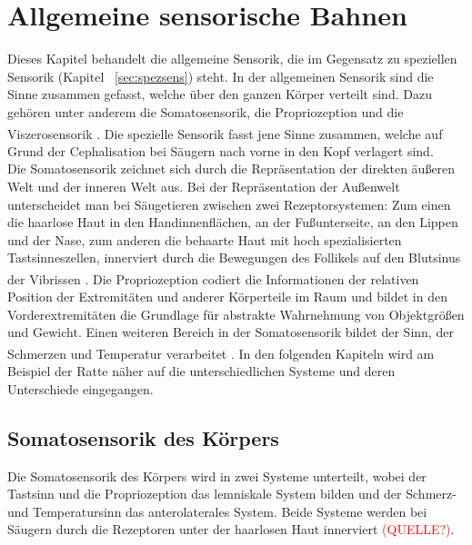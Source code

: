 \documentclass[12pt,a4paper,pdftex]{article}
\begin{document}


\newpage
\section{Allgemeine sensorische Bahnen} \label{sec:sensorische_Bahnen}
Dieses Kapitel behandelt die allgemeine Sensorik,  die im Gegensatz zu speziellen Sensorik (Kapitel~ \ref{sec:spezsens}) steht. In der allgemeinen Sensorik sind die Sinne zusammen gefasst, welche über den ganzen Körper verteilt sind. Dazu gehören unter anderem die Somatosensorik, die Propriozeption und die Viszerosensorik \textsuperscript{\cite[22]{kandel2013principles}}. Die spezielle Sensorik  fasst jene Sinne zusammen, welche auf Grund der Cephalisation bei Säugern nach vorne in den Kopf verlagert sind.
\\
\noindent
Die Somatosensorik zeichnet sich durch die Repräsentation der direkten äußeren Welt und der inneren Welt aus. Bei der Repräsentation der Außenwelt unterscheidet man bei Säugetieren zwischen zwei Rezeptorsystemen: Zum einen die haarlose Haut in den Handinnenflächen, an der Fußunterseite, an den Lippen und der Nase, zum anderen die behaarte Haut mit hoch spezialisierten Tastsinneszellen, innerviert durch die Bewegungen des Follikels auf den Blutsinus  der Vibrissen  \textsuperscript{\cite[24]{paxinos2014rat}}.
Die Propriozeption codiert die Informationen der relativen Position der Extremitäten und anderer Körperteile im Raum und bildet in den Vorderextremitäten die Grundlage für abstrakte Wahrnehmung von Objektgrößen und Gewicht. Einen weiteren Bereich in der Somatosensorik bildet der Sinn, der Schmerzen und Temperatur verarbeitet \textsuperscript{\cite[24]{paxinos2014rat}}.
In den folgenden Kapiteln wird am Beispiel der Ratte näher auf die unterschiedlichen Systeme und deren Unterschiede eingegangen.


\subsection{Somatosensorik  des Körpers}
Die Somatosensorik des Körpers wird in zwei Systeme unterteilt, wobei der Tastsinn  und die Propriozeption das lemniskale System  bilden und der Schmerz- und Temperatursinn  das anterolaterales System.  Beide Systeme werden bei Säugern durch die Rezeptoren unter der haarlosen Haut innerviert \textcolor{red}{(QUELLE?)}.
\end{document}
